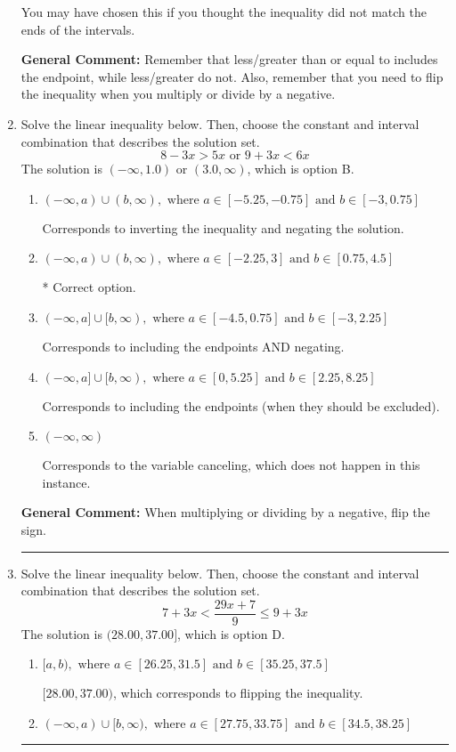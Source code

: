 \documentclass{extbook}[14pt]
\newcommand{\litem}[1]{\item #1

\rule{\textwidth}{0.4pt}}
\begin{document}
\begin{enumerate}
{\begin{enumerate}[label=\Alph*.]
You may have chosen this if you thought the inequality did not match the ends of the intervals.
\end{enumerate}

\textbf{General Comment:} Remember that less/greater than or equal to includes the endpoint, while less/greater do not. Also, remember that you need to flip the inequality when you multiply or divide by a negative.
}
\litem{
Solve the linear inequality below. Then, choose the constant and interval combination that describes the solution set.
\[ 8 - 3 x > 5 x \text{ or } 9 + 3 x < 6 x \]The solution is \( (-\infty, 1.0) \text{ or } (3.0, \infty) \), which is option B.\begin{enumerate}[label=\Alph*.]
\item \( (-\infty, a) \cup (b, \infty), \text{ where } a \in [-5.25, -0.75] \text{ and } b \in [-3, 0.75] \)

Corresponds to inverting the inequality and negating the solution.
\item \( (-\infty, a) \cup (b, \infty), \text{ where } a \in [-2.25, 3] \text{ and } b \in [0.75, 4.5] \)

 * Correct option.
\item \( (-\infty, a] \cup [b, \infty), \text{ where } a \in [-4.5, 0.75] \text{ and } b \in [-3, 2.25] \)

Corresponds to including the endpoints AND negating.
\item \( (-\infty, a] \cup [b, \infty), \text{ where } a \in [0, 5.25] \text{ and } b \in [2.25, 8.25] \)

Corresponds to including the endpoints (when they should be excluded).
\item \( (-\infty, \infty) \)

Corresponds to the variable canceling, which does not happen in this instance.
\end{enumerate}

\textbf{General Comment:} When multiplying or dividing by a negative, flip the sign.
}
\litem{
Solve the linear inequality below. Then, choose the constant and interval combination that describes the solution set.
\[ 7 + 3 x < \frac{29 x + 7}{9} \leq 9 + 3 x \]The solution is \( (28.00, 37.00] \), which is option D.\begin{enumerate}[label=\Alph*.]
\item \( [a, b), \text{ where } a \in [26.25, 31.5] \text{ and } b \in [35.25, 37.5] \)

$[28.00, 37.00)$, which corresponds to flipping the inequality.
\item \( (-\infty, a) \cup [b, \infty), \text{ where } a \in [27.75, 33.75] \text{ and } b \in [34.5, 38.25] \)


\end{enumerate}}
\end{enumerate}
\end{document}
